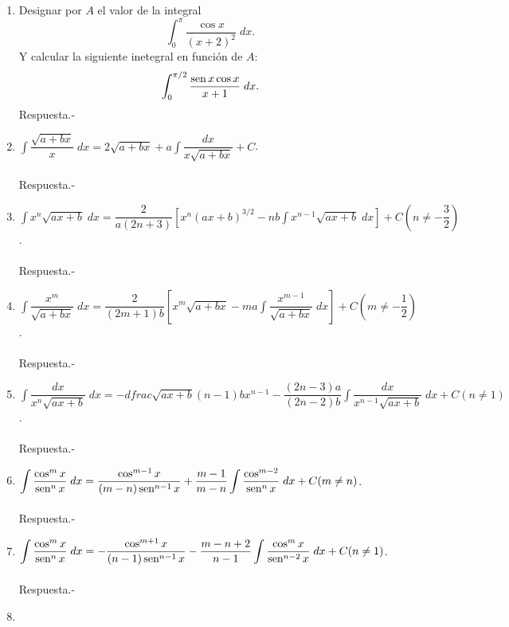 \begin{enumerate}[\bfseries 1.]
    \item Designar por $A$ el valor de la integral
    $$\int_0^\pi \dfrac{\cos x}{\left(x+2\right)^2}\; dx.$$
    Y calcular la siguiente inetegral en función de $A$:
    $$\int_0^{\pi/2}\dfrac{\mathop{\mbox{\normalfont sen}}\nolimits x\cos x}{x+1}\; dx.$$
	Respuesta.-\;

    \item $\displaystyle\int \dfrac{\sqrt{a+bx}}{x}\; dx = 2\sqrt{a+bx}+a\int \dfrac{dx}{x\sqrt{a+bx}}+C$.\\\\
	Respuesta.-\;

    \item $\displaystyle\int x^n \sqrt{ax+b}\; dx = \dfrac{2}{a(2n+3)}\left[x^n(ax+b)^{3/2}-nb\int x^{n-1}\sqrt{ax+b}\; dx\right]+C\left(n\neq -\dfrac{3}{2}\right)$.\\\\
	Respuesta.-\;

    \item $\displaystyle\int \dfrac{x^m}{\sqrt{a+bx}}\; dx = \dfrac{2}{(2m+1)b}\left[x^m \sqrt{a+bx}-ma\int \dfrac{x^{m-1}}{\sqrt{a+bx}}\; dx\right]+C \left(m\neq -\dfrac{1}{2}\right)$.\\\\
	Respuesta.-\;

    \item $\displaystyle\int \dfrac{dx}{x^n\sqrt{ax+b}}\; dx = -dfrac{\sqrt{ax+b}}{(n-1)bx^{n-1}}-\dfrac{(2n-3)a}{(2n-2)b}\int \dfrac{dx}{x^{n-1}\sqrt{ax+b}}\; dx + C(n\neq 1)$.\\\\
	Respuesta.-\; 

    \item $\displaystyle\int \dfrac{\cos^m x}{\mathop{\mbox{\normalfont sen}}\nolimits^n x}\; dx = \dfrac{\cos^{m-1}x}{(m-n)\mathop{\mbox{\normalfont sen}}\nolimits^{n-1}x}+\dfrac{m-1}{m-n}\int \dfrac{\cos^{m-2}}{\mathop{\mbox{\normalfont sen}}\nolimits^n x}\; dx + C (m\neq n)$.\\\\
	Respuesta.-\;

    \item $\displaystyle\int \dfrac{\cos^m x}{\mathop{\mbox{\normalfont sen}}\nolimits^n x}\; dx = -\dfrac{\cos^{m+1}x}{(n-1)\mathop{\mbox{\normalfont sen}}\nolimits^{n-1}x}-\dfrac{m-n+2}{n-1}\int \dfrac{\cos^m x}{\mathop{\mbox{\normalfont sen}}\nolimits^{n-2}x}\; dx + C (n\neq 1)$.\\\\
	Respuesta.-\;

    \item 
	\begin{enumerate}[a)]


\end{enumerate}
\end{enumerate}
